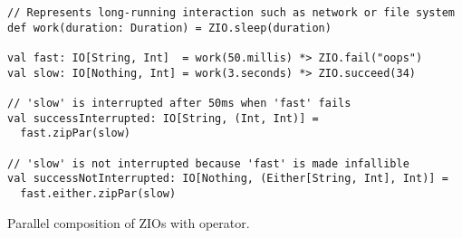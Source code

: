 \begin{algorithm}

\begin{verbatim}
// Represents long-running interaction such as network or file system
def work(duration: Duration) = ZIO.sleep(duration)

val fast: IO[String, Int]  = work(50.millis) *> ZIO.fail("oops")
val slow: IO[Nothing, Int] = work(3.seconds) *> ZIO.succeed(34)

// 'slow' is interrupted after 50ms when 'fast' fails
val successInterrupted: IO[String, (Int, Int)] =
  fast.zipPar(slow)

// 'slow' is not interrupted because 'fast' is made infallible
val successNotInterrupted: IO[Nothing, (Either[String, Int], Int)] =
  fast.either.zipPar(slow)
\end{verbatim}

\caption{Parallel composition of ZIOs with  operator. \label{zio:parallel-combinators}}
\end{algorithm}